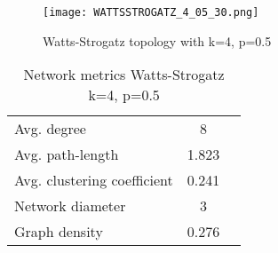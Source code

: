 \documentclass[Bachelorarbeit.tex]{subfiles}
\begin{document}
\begin{figure}[H]
	\centering
  \texttt{[image: WATTSSTROGATZ\_4\_05\_30.png]}
	\caption{Watts-Strogatz topology with k=4, p=0.5}
	\label{fig:topology_WATTSSTROGATZ_4_05_30}
\end{figure}

\begin{table}[h]
	\centering
	\caption{Network metrics Watts-Strogatz k=4, p=0.5}
	\begin{tabular} { l c r }
		\hline
		Avg. degree & 8 \\
		Avg. path-length & 1.823 \\
		Avg. clustering coefficient & 0.241 \\
		Network diameter & 3 \\
		Graph density & 0.276 \\
		\hline
	\end{tabular}
\end{table}
\end{document}

